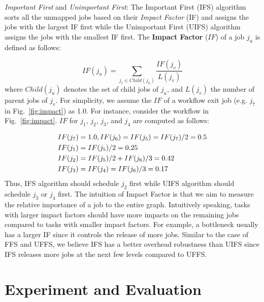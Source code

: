 \documentclass[final]{IEEEtran}
\begin{document}
\emph{Important First} and \emph{Unimportant First}: The Important First (IFS) algorithm sorts all the unmapped jobs based on their \emph{Impact Factor} (IF) and assigns the jobs with the largest IF first while the Unimportant First (UIFS) algorithm assigns the jobs with the smallest IF first. 
The \textbf{Impact Factor} ($IF$) of a job $j_u$ is defined as follows:

\begin{equation}
	IF(j_u)=\sum_{j_v\in Child(j_u)}^{}\frac{IF(j_v)}{L(j_v)}
\end{equation}
where $Child(j_u)$ denotes the set of child jobs of $j_u$, and $L(j_v)$ the number of parent jobs of $j_v$. For simplicity, we assume the $IF$ of a workflow exit job (e.g. $j_7$ in Fig.~\ref{fig:impact}) as 1.0. For instance, consider the workflow in Fig.~\ref{fig:impact}. $IF$ for $j_1$, $j_2$, $j_3$, and $j_4$ are computed as follows:

\begin{eqnarray}
	\displaystyle  
	&IF(j_7 )=1.0, IF(j_6 )=IF(j_5 )=IF(j_7 )/2=0.5\nonumber  \\
	&IF(j_1 )=IF(j_5)/2=0.25\nonumber \\
	&IF(j_2 )=IF(j_5 )/2+IF(j_6)/3=0.42\nonumber \\
	&IF(j_3 )=IF(j_4 )=IF(j_6 )/3=0.17\nonumber 
\end{eqnarray}
Thus, IFS algorithm should schedule $j_2$ first while UIFS algorithm should schedule $j_3$ or $j_4$ first. The intuition of Impact Factor is that we aim to measure the relative importance of a job to the entire graph. Intuitively speaking, tasks with larger impact factors should have more impacts on the remaining jobs compared to tasks with smaller impact factors. For example, a bottleneck usually has a larger IF since it controls the release of more jobs. 
Similar to the case of FFS and UFFS, we believe IFS has a better overhead robustness than UIFS since IFS releases more jobs at the next few levels compared to UFFS. 







\section{Experiment and Evaluation}
\label{sec:experiments}
\end{document}
